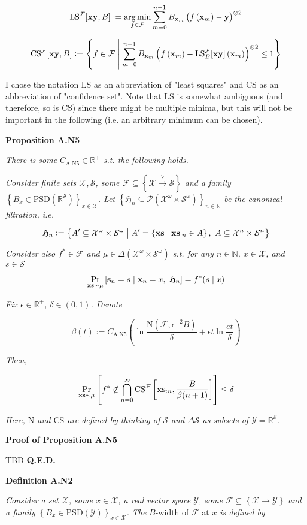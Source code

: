 \documentclass[a4paper]{article}
\newcommand{\Co}[1]{}
\newcommand{\AP}[1]{\left(#1\right)}
\newcommand{\AB}[1]{\left[#1\right]}
\newcommand{\AC}[1]{\left\{#1\right\}}
\newcommand{\ABM}[2]{\left[#1\;\middle\vert\;#2\right]}
\newcommand{\ACM}[2]{\left\{#1\;\middle\vert\;#2\right\}}
\newcommand{\Pa}[2]{\underset{#1}{\operatorname{Pr}}\AB{#2}}
\newcommand{\CP}[3]{\underset{#1}{\operatorname{Pr}}\ABM{#2}{#3}}
\newcommand{\PS}[1]{\mathcal{P}\AP{#1}}
\newcommand{\Argmin}[1]{\underset{#1}{\operatorname{arg\,min}}\,}
\newcommand{\Nats}{\mathbb{N}}
\newcommand{\Reals}{\mathbb{R}}
\newcommand{\PSD}{\mathrm{PSD}}
\newcommand{\K}{\xrightarrow{\mathrm{k}}}
\newcommand{\B}{B}
\newcommand{\X}{\mathcal{X}}
\newcommand{\Y}{\mathcal{Y}}
\newcommand{\F}{\mathcal{F}}
\newcommand{\St}{\mathcal{S}}
\newcommand{\N}{\mathrm{N}}
\newcommand{\LS}{\mathrm{LS}}
\newcommand{\CS}{\mathrm{CS}}
\begin{document}
$$\LS^{\F}[\bold{xy},\B]:=\Argmin{f\in\F}{\sum_{m=0}^{n-1}\B _{\bold{x}_m}\AP{f\AP{\bold{x}_m}-\bold{y} }^{\otimes2}}$$

$$\CS^{\F}[\bold{xy},B]:=\ACM{f\in\F}{\sum_{m=0}^{n-1}\B _{\bold{x}_m}\AP{f\AP{\bold{x}_m}-\LS_\B ^\F[\bold{xy}]\AP{\bold{x}_m}}^{\otimes2}\leq 1}$$

I chose the notation $\LS$ as an abbreviation of "least squares" and $\CS$ as an abbreviation of "confidence set". Note that $\LS$ is somewhat ambiguous (and therefore, so is $\CS$) since there might be multiple minima, but this will not be important in the following (i.e. an arbitrary minimum can be chosen).

\textbf{Proposition A.N5}\Co{b}

\textit{There is some $C_{\mathrm{A.N5}}\in\Reals^+$ s.t. the following holds.}\Co{i}

\textit{Consider finite sets $\X,\St$, some $\F\subseteq\AC{\X\K\St}$ and a family $\AC{\B _x\in\PSD\AP{\Reals^\St}}_{x\in\X}$. Let $\AC{\mathfrak{H}_n\subseteq\PS{\X^\omega\times\St^\omega}}_{n\in\Nats}$ be the canonical filtration, i.e.}\Co{i}

$$\mathfrak{H}_n:=\ACM{A'\subseteq\X^\omega\times\St^\omega}{A'=\ACM{\bold{xs}}{\bold{xs}_{:n}\in A},\ A\subseteq\X^n\times\St^n}$$

\textit{Consider also $f^*\in\F$ and $\mu\in\Delta\AP{\X^\omega\times\St^\omega}$ s.t. for any $n\in\Nats$, $x\in\X$, and $s\in\St$}\Co{i}

$$\CP{\bold{xs}\sim\mu}{\bold{s}_n=s}{\bold{x}_n=x,\ \mathfrak{H}_n} = f^*(s\mid x)$$

\textit{Fix $\epsilon\in\Reals^+$, $\delta\in(0,1)$. Denote}\Co{i}

$$\beta(t):=C_{\mathrm{A.N5}}\AP{\ln{\frac{\N(\F,\epsilon^{-2}\B )}{\delta}}+\epsilon t\ln{\frac{et}{\delta}}}$$

\textit{Then,}\Co{i}

$$\Pa{\bold{xs}\sim\mu}{f^*\not\in\bigcap_{n=0}^\infty\CS^\F\AB{\bold{xs}_{:n},\frac{\B }{\beta(n+1)}}} \leq \delta$$

\textit{Here, $\N$ and $\CS$ are defined by thinking of $\St$ and $\Delta\St$ as subsets of $\Y=\Reals^\St$.}\Co{i}

\textbf{Proof of Proposition A.N5}\Co{b}

TBD \textbf{Q.E.D.}\Co{b}

\Co{b}

\textbf{Definition A.N2}\Co{b}

\textit{Consider a set $\X$, some $x\in\X$, a real vector space $\Y$, some $\F\subseteq\AC{\X\rightarrow\Y}$ and a family $\AC{\B _x\in\PSD(\Y)}_{x\in\X}$. The}\Co{i} $\B $-width of $\F$ at $x$ \textit{is defined by}\Co{i}
\end{document}
